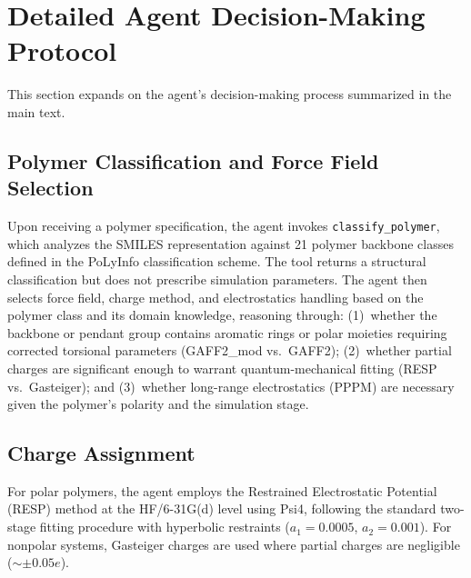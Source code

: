 \documentclass[journal=acsami,manuscript=suppinfo]{achemso}
\begin{document}
\section{Detailed Agent Decision-Making Protocol}
\label{sec:si_decision_protocol}

This section expands on the agent's decision-making process summarized in the main text.

\subsection{Polymer Classification and Force Field Selection}

Upon receiving a polymer specification, the agent invokes \texttt{classify\_polymer}, which analyzes the SMILES representation against 21 polymer backbone classes defined in the PoLyInfo classification scheme.\cite{otsuka2011polyinfo}
The tool returns a structural classification but does not prescribe simulation parameters.
The agent then selects force field, charge method, and electrostatics handling based on the polymer class and its domain knowledge, reasoning through: (1)~whether the backbone or pendant group contains aromatic rings or polar moieties requiring corrected torsional parameters (GAFF2\_mod\cite{trag2019gaff2mod} vs.\ GAFF2\cite{wang2004gaff}); (2)~whether partial charges are significant enough to warrant quantum-mechanical fitting (RESP vs.\ Gasteiger); and (3)~whether long-range electrostatics (PPPM) are necessary given the polymer's polarity and the simulation stage.

\subsection{Charge Assignment}

For polar polymers, the agent employs the Restrained Electrostatic Potential (RESP) method\cite{bayly1993resp} at the HF/6-31G(d) level using Psi4,\cite{smith2020psi4} following the standard two-stage fitting procedure with hyperbolic restraints ($a_1 = 0.0005$, $a_2 = 0.001$).
For nonpolar systems, Gasteiger charges are used where partial charges are negligible ($\sim\pm 0.05e$).

\end{document}
